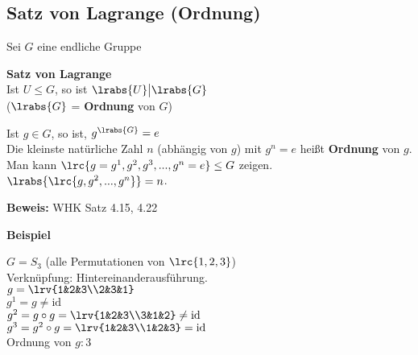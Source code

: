	\subsection{Satz von Lagrange (Ordnung)}
	
	Sei $G$ eine endliche Gruppe
		\item \textbf{Satz von Lagrange}\\
		Ist $U\leq G$, so ist $\lrabs{U}\big|\lrabs{G}$\\
		($\lrabs{G}$ = \textbf{Ordnung} von $G$)
		
		\item Ist $g\in G$, so ist, $g^{\lrabs{G}}=e$\\
		Die kleinste natürliche Zahl $n$ (abhängig von $g$) mit $g^n=e$ heißt \textbf{Ordnung} von $g$.\\
		Man kann $\lrc{g=g^1,g^2,g^3,...,g^n=e}\leq G$ zeigen.\\
		$\lrabs{\lrc{g,g^2,...,g^n}}=n$.
		
		\textbf{Beweis:} WHK Satz 4.15, 4.22
		
		\textbf{Beispiel}
		
		$G=S_3$ (alle Permutationen von $\lrc{1,2,3}$)\\
		Verknüpfung: Hintereinanderausführung.\\
		$g=\lrv{1&2&3\\2&3&1}$ \\
		$g^1 = g \neq\mbox{id}$ \\
		$g^2 = g\circ g =\lrv{1&2&3\\3&1&2}\neq\mbox{id}$\\
		$g^3 = g^2\circ g =\lrv{1&2&3\\1&2&3}=\mbox{id}$\\
		Ordnung von $g: 3$
	\subExEnd
